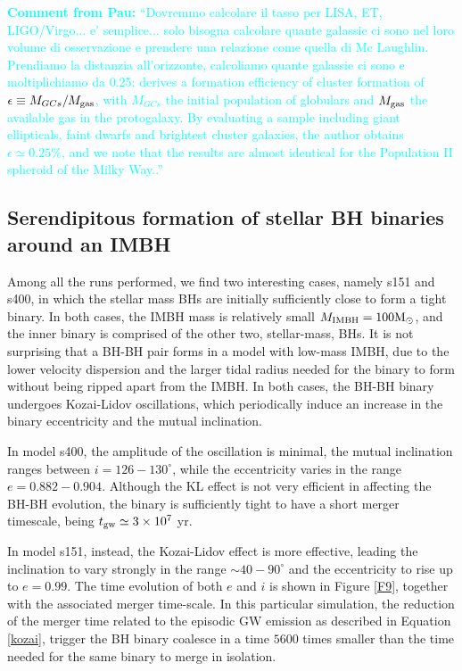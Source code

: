 \documentclass[useAMS,usenatbib]{mn2e}
\newcommand{\Ms}{{\rm M}_\odot}
\newcommand{\ibh}{{\rm IMBH}}
\newcommand{\pau}[1]{\textcolor{cyan}{{\bf Comment from Pau:} ``#1.''}}
\begin{document}
\pau{Dovremmo calcolare il tasso per LISA, ET, LIGO/Virgo... e' semplice... solo bisogna calcolare quante galassie ci sono
nel loro volume di osservazione e prendere una relazione come quella di Mc Laughlin. Prendiamo la distanzia all'orizzonte,
calcoliamo quante galassie ci sono e moltiplichiamo da 0.25:
\cite{McLaughlin99} derives a formation efficiency of cluster formation of
$\epsilon \equiv M_{GCs}/M_{\rm gas}$, with $M_{GCs}$ the initial
population of globulars and $M_{\rm gas}$ the available gas in the
protogalaxy. By evaluating a sample including giant ellipticals, faint dwarfs
and brightest cluster galaxies, the author obtains $\epsilon \simeq 0.25\%$,
and we note that the results are almost identical for the Population II
spheroid of the Milky Way.}


\subsection{Serendipitous formation of stellar BH binaries around an IMBH}

Among all the runs performed, we find two interesting cases, namely s151 and s400, in which the stellar mass BHs are initially sufficiently close to form a tight binary. In both cases, the IMBH mass is relatively small $M_{\ibh} = 100\Ms$, and the inner binary is comprised of the other two, stellar-mass, BHs. It is not surprising that a BH-BH pair forms in a model with low-mass IMBH, due to the lower velocity dispersion and the larger tidal radius needed for the binary to form without being ripped apart from the IMBH. In both cases, the BH-BH binary undergoes Kozai-Lidov oscillations, which periodically induce an increase in the binary eccentricity and the mutual inclination.

In model s400, the amplitude of the oscillation is minimal, the mutual inclination ranges between $i = 126-130^\circ$, while the eccentricity varies in the range $e = 0.882-0.904$. Although the KL effect is not very efficient in affecting the BH-BH evolution, the binary is sufficiently tight to have a short merger timescale, being $t_{\rm gw} \simeq 3\times 10^7$ yr.

In model s151, instead, the Kozai-Lidov effect is more effective, leading the inclination to vary strongly in the range $\sim 40-90^\circ$ and the eccentricity to rise up to $e = 0.99$. The time evolution of both $e$ and $i$ is shown in Figure \ref{F9}, together with the associated merger time-scale. 
In this particular simulation, the reduction of the merger time related to the episodic GW emission as described in Equation \ref{kozai}, trigger the BH binary coalesce in a time $5600$ times smaller than the time needed for the same binary to merge in isolation.
\end{document}
